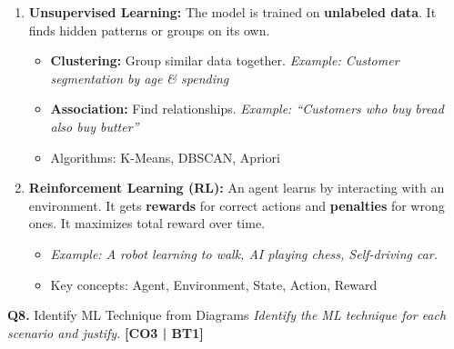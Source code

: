 \documentclass[12pt,a4paper]{article}
\newcommand{\Qno}[1]{\textbf{\color{darkred}Q#1.}}
\newcommand{\term}[1]{\textbf{\color{headingcolor}#1}}
\begin{document}
\begin{answerenv}
\begin{enumerate}[leftmargin=1.8em, itemsep=5pt]
  \item \term{Unsupervised Learning:} The model is trained on \textbf{unlabeled data}. It finds hidden patterns or groups on its own.
  \begin{itemize}[leftmargin=1.5em]
    \item \textbf{Clustering:} Group similar data together. \textit{Example: Customer segmentation by age \& spending}
    \item \textbf{Association:} Find relationships. \textit{Example: ``Customers who buy bread also buy butter''}
    \item Algorithms: K-Means, DBSCAN, Apriori
  \end{itemize}

  \item \term{Reinforcement Learning (RL):} An agent learns by interacting with an environment. It gets \textbf{rewards} for correct actions and \textbf{penalties} for wrong ones. It maximizes total reward over time.
  \begin{itemize}[leftmargin=1.5em]
    \item \textit{Example: A robot learning to walk, AI playing chess, Self-driving car.}
    \item Key concepts: Agent, Environment, State, Action, Reward
  \end{itemize}
\end{enumerate}

\end{answerenv}

\vspace{8pt}

\begin{questionbox}{\Qno{8} Identify ML Technique from Diagrams}
\textit{Identify the ML technique for each scenario and justify.} \hfill \textbf{[CO3 | BT1]}
\end{questionbox}
\end{document}
